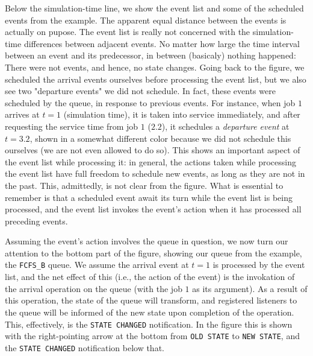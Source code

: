 Below the simulation-time line,
we show the event list and some of the scheduled events
from the example.
The apparent equal distance between the events
is actually on pupose.
The event list is really not concerned with the
simulation-time differences between adjacent events.
No matter how large the time interval between an
event and its predecessor,
in between (basicaly) nothing happened:
There were not events,
and hence,
no state changes.
Going back to the figure,
we scheduled the arrival events ourselves
before processing the event list,
but we also see two "departure events"
we did not schedule.
In fact, these events were scheduled by the
queue, in response to previous events.
For instance, when job $1$ arrives at $t=1$ (simulation time),
it is taken into service immediately,
and after requesting the service time from job $1$ ($2.2$),
it schedules a {\em departure event\/} at $t=3.2$,
shown in a somewhat different color because we
did not schedule this ourselves (we are not even allowed to do so).
This shows an important aspect of the event list while processing it:
in general, the actions taken while processing the event list have
full freedom to schedule new events,
as long as they are not in the past.
This, admittedly, is not clear from the figure.
What is essential to remember is that a scheduled event
await its turn while the event list is being processed,
and the event list invokes the event's action
when it has processed all preceding events.

Assuming the event's action involves the queue in question,
we now turn our attention to the bottom part of the figure,
showing our queue from the example, the \lstinline|FCFS_B| queue.
We assume the arrival event at $t=1$ is processed by the event list,
and the net effect of this (i.e., the action of the event)
is the invokation of the arrival operation on the queue
(with the job $1$ as its argument).
As a result of this operation,
the state of the queue will transform,
and registered listeners to the queue will be informed
of the new state upon completion of the operation.
This, effectively, is the \lstinline|STATE CHANGED| notification.
In the figure this is shown with the right-pointing arrow at the bottom
from \lstinline|OLD STATE| to \lstinline|NEW STATE|,
and the \lstinline|STATE CHANGED| notification below that.

